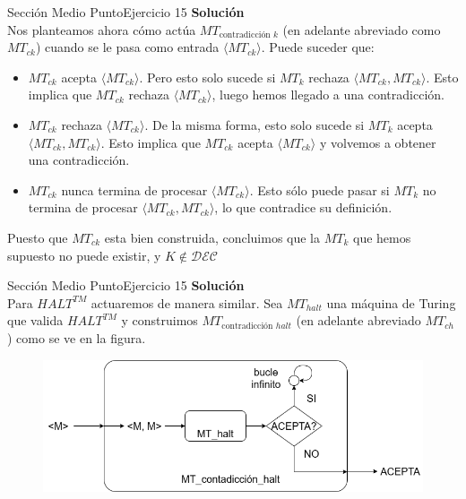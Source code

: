\documentclass[10pt, envcountsect, presentation, aspectratio=169]{beamer}
\begin{document}

\begin{frame}{Sección Medio Punto}{Ejercicio 15}
    \textbf{Solución}\\
    Nos planteamos ahora cómo actúa $MT_{\text{contradicción }k}$ (en adelante abreviado como $MT_{ck}$) cuando se le pasa como entrada $\langle MT_{ck}\rangle$. Puede suceder que:
    \begin{itemize}
        \item $MT_{ck}$ acepta $\langle MT_{ck}\rangle$. Pero esto solo sucede si $MT_k$ rechaza $\langle MT_{ck}, MT_{ck}\rangle$. Esto implica que $MT_{ck}$ rechaza $\langle MT_{ck}\rangle$, luego hemos llegado a una contradicción.
        \item $MT_{ck}$ rechaza $\langle MT_{ck}\rangle$. De la misma forma, esto solo sucede si $MT_k$ acepta $\langle MT_{ck}, MT_{ck}\rangle$. Esto implica que $MT_{ck}$ acepta $\langle MT_{ck}\rangle$ y volvemos a obtener una contradicción.
        \item $MT_{ck}$ nunca termina de procesar $\langle MT_{ck}\rangle$. Esto sólo puede pasar si $MT_k$ no termina de procesar $\langle MT_{ck}, MT_{ck}\rangle$, lo que contradice su definición.
    \end{itemize}
    Puesto que $MT_{ck}$ esta bien construida, concluimos que la $MT_k$ que hemos supuesto no puede existir, y $K \notin\mathcal{DEC}$
\end{frame}


\begin{frame}{Sección Medio Punto}{Ejercicio 15}
    \textbf{Solución}\\
    Para $HALT^{TM}$ actuaremos de manera similar. Sea $MT_{halt}$ una máquina de Turing que valida $HALT^{TM}$ y construimos $MT_{\text{contradicción }halt}$ (en adelante abreviado $MT_{ch}$) como se ve en la figura.
    \begin{figure}
        \includegraphics[scale=0.4]{images/contradiccion_halt.png}
    \end{figure}
\end{frame}
\end{document}
